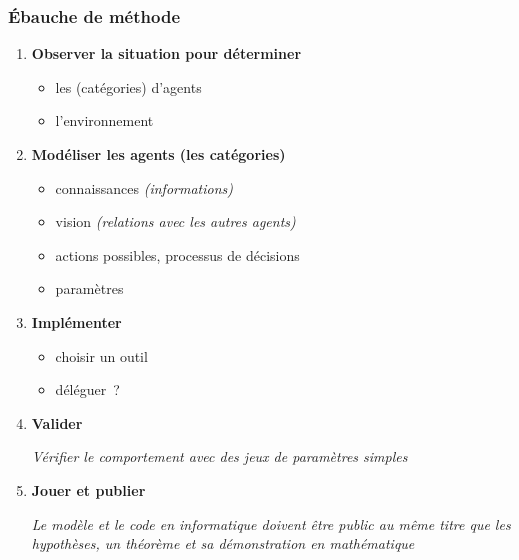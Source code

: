 \documentclass{beamer}
\begin{document}

\begin{frame}
  \frametitle{Ébauche de méthode}

  \begin{enumerate}
  \item \textbf{Observer la situation pour déterminer}
    \begin{itemize}
    \item les (catégories) d'agents
    \item l'environnement
    \end{itemize}
\pause
  \item \textbf{Modéliser les agents (les catégories)}
    \begin{itemize}
    \item connaissances \hfill {\small\slshape(informations)}
    \item vision \hfill {\small\slshape(relations avec les autres agents)}
    \item actions possibles, processus de décisions
    \item paramètres
    \end{itemize}
\pause
  \item \textbf{Implémenter}
    \begin{itemize}
    \item choisir un outil
    \item déléguer~?
    \end{itemize}
\pause
  \item \textbf{Valider}
    \par
    {\footnotesize\slshape Vérifier le comportement avec des jeux de paramètres simples}
\pause
  \item \textbf{Jouer et publier}
    \par
    {\footnotesize\slshape Le modèle et le code en informatique doivent être public au même titre que les hypothèses, un théorème et sa démonstration en mathématique}
  \end{enumerate}
\end{frame}

\end{document}
